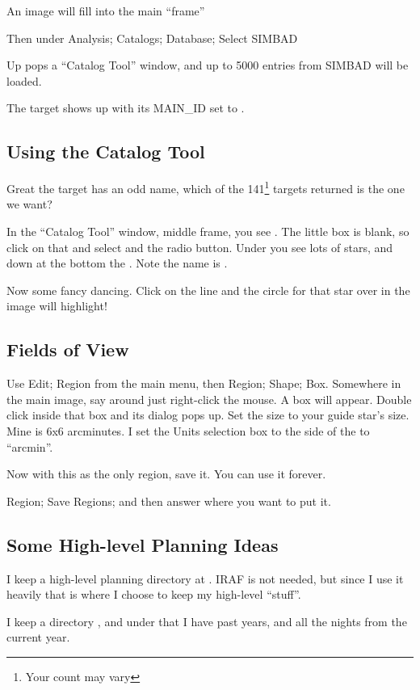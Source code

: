 \documentclass[letter,11pt,oneside]{article}
\newcommand{\dhl}[1]{{\color{verbcolor}{\texttt#1}}}
\begin{document}
An image will fill into the main ``frame''

Then under
Analysis; Catalogs; Database;
Select SIMBAD

Up pops a ``Catalog Tool'' window, and up to
5000 entries from SIMBAD will be loaded.

The target shows up with its MAIN\_ID set to \dhl{EM* MWC 560}.

\subsection{Using the Catalog Tool}

Great the target has an odd name, which of the 141\footnote{Your count
  may vary} targets returned is the one we want?

In the ``Catalog Tool'' window, middle frame, you see \dhl{Sort}.
The little box is blank, so click on that and select \dhl{OTYPE\_S}
and the \dhl{Increase} radio button. Under \dhl{OTYPE\_S} you
see lots of stars, and down at the bottom the \dhl{Symbotic*}.
Note the name is \dhl{EM* MWC 560}.

Now some fancy dancing. Click on the line and the
circle for that star over in the image will highlight!

\subsection{Fields of View}

Use Edit; Region from the main menu, then Region; Shape;
Box. Somewhere in the main image, say around \dhl{EM* MWC 560}
just right-click the mouse. A box will appear. Double click
inside that box and its dialog pops up. Set the size to
your guide star's size. Mine is 6x6 arcminutes. I set the
Units selection box to the side of the \dhl{Size} to ``arcmin''.

Now with this as the only region, save it. You can use it forever.

Region; Save Regions; and then answer where you want to put it.

\subsection{Some High-level Planning Ideas}

I keep a high-level planning directory at \dhl{~/iraf/usw}. IRAF is
not needed, but since I use it heavily that is where I choose to
keep my high-level ``stuff''.

I keep a directory \dhl{~/Observations}, and under that I have
past years, and all the nights from the current year.
\end{document}
